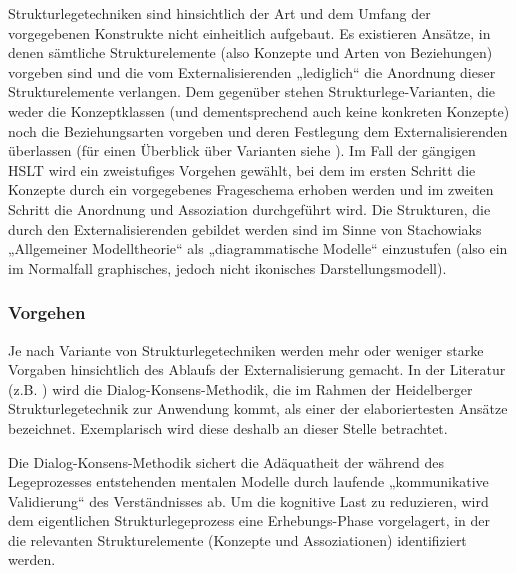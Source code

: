 Strukturlegetechniken sind hinsichtlich der Art und dem Umfang der vorgegebenen Konstrukte nicht einheitlich aufgebaut. Es existieren Ansätze, in denen sämtliche Strukturelemente (also Konzepte und Arten von Beziehungen) vorgeben sind und die vom Externalisierenden „lediglich“ die Anordnung dieser Strukturelemente verlangen. Dem gegenüber stehen Strukturlege-Varianten, die weder die Konzeptklassen (und dementsprechend auch keine konkreten Konzepte) noch die Beziehungsarten vorgeben und deren Festlegung dem Externalisierenden überlassen (für einen Überblick über Varianten siehe \citep[][S. 29]{Ifenthaler06}). Im Fall der gängigen \gls{HSLT} \citep{Scheele88} wird ein zweistufiges Vorgehen gewählt, bei dem im ersten Schritt die Konzepte durch ein vorgegebenes Frageschema erhoben werden und im zweiten Schritt die Anordnung und Assoziation durchgeführt wird. Die Strukturen, die durch den Externalisierenden gebildet werden sind im Sinne von Stachowiaks „Allgemeiner Modelltheorie“ \citep{Stachowiak73} als „diagrammatische Modelle“ einzustufen (also ein im Normalfall graphisches, jedoch nicht ikonisches Darstellungsmodell).

\subsubsection{Vorgehen}

Je nach Variante von Strukturlegetechniken werden mehr oder weniger starke Vorgaben hinsichtlich des Ablaufs der Externalisierung gemacht. In der Literatur (z.B. \citep{Ifenthaler06}) wird die Dialog-Konsens-Methodik, die im Rahmen der Heidelberger Strukturlegetechnik \citep{Scheele88} zur Anwendung kommt, als einer der elaboriertesten Ansätze bezeichnet. Exemplarisch wird diese deshalb an dieser Stelle betrachtet.

Die Dialog-Konsens-Methodik sichert die Adäquatheit der während des Legeprozesses entstehenden mentalen Modelle durch laufende „kommunikative Validierung“ des Verständnisses ab. Um die kognitive Last zu reduzieren, wird dem eigentlichen Strukturlegeprozess eine Erhebungs-Phase vorgelagert, in der die relevanten Strukturelemente (Konzepte und Assoziationen) identifiziert werden. 

